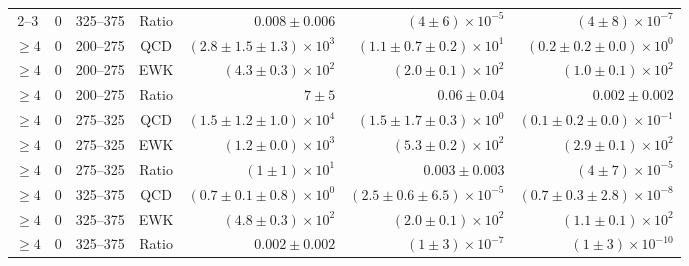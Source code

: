 \begin{table}[h!]
\begin{tabular}{ccccrrr}
2--3 & 0 & 325--375 & Ratio  & $0.008 \pm 0.006$ & $\left(4 \pm 6\right) \times 10^{-5}$ & $\left(4 \pm 8\right) \times 10^{-7}$\\ [1.0ex]
$\geq 4$ & 0 & 200--275 & QCD  & $\left(2.8 \pm 1.5 \pm 1.3 \right) \times 10^{3}$ & $\left(1.1 \pm 0.7 \pm 0.2 \right) \times 10^{1}$ & $\left(0.2 \pm 0.2 \pm 0.0 \right) \times 10^{0}$\\
$\geq 4$ & 0 & 200--275 & EWK  & $\left(4.3 \pm 0.3\right) \times 10^{2}$ & $\left(2.0 \pm 0.1\right) \times 10^{2}$ & $\left(1.0 \pm 0.1\right) \times 10^{2}$\\
$\geq 4$ & 0 & 200--275 & Ratio  & $7 \pm 5$ & $0.06 \pm 0.04$ & $0.002 \pm 0.002$\\ [1.0ex]
$\geq 4$ & 0 & 275--325 & QCD  & $\left(1.5 \pm 1.2 \pm 1.0 \right) \times 10^{4}$ & $\left(1.5 \pm 1.7 \pm 0.3 \right) \times 10^{0}$ & $\left(0.1 \pm 0.2 \pm 0.0 \right) \times 10^{-1}$\\
$\geq 4$ & 0 & 275--325 & EWK  & $\left(1.2 \pm 0.0\right) \times 10^{3}$ & $\left(5.3 \pm 0.2\right) \times 10^{2}$ & $\left(2.9 \pm 0.1\right) \times 10^{2}$\\
$\geq 4$ & 0 & 275--325 & Ratio  & $\left(1 \pm 1\right) \times 10^{1}$ & $0.003 \pm 0.003$ & $\left(4 \pm 7\right) \times 10^{-5}$\\ [1.0ex]
$\geq 4$ & 0 & 325--375 & QCD  & $\left(0.7 \pm 0.1 \pm 0.8 \right) \times 10^{0}$ & $\left(2.5 \pm 0.6 \pm 6.5 \right) \times 10^{-5}$ & $\left(0.7 \pm 0.3 \pm 2.8 \right) \times 10^{-8}$\\
$\geq 4$ & 0 & 325--375 & EWK  & $\left(4.8 \pm 0.3\right) \times 10^{2}$ & $\left(2.0 \pm 0.1\right) \times 10^{2}$ & $\left(1.1 \pm 0.1\right) \times 10^{2}$\\
$\geq 4$ & 0 & 325--375 & Ratio  & $0.002 \pm 0.002$ & $\left(1 \pm 3\right) \times 10^{-7}$ & $\left(1 \pm 3\right) \times 10^{-10}$\\ [1.0ex]
\hline
\hline
\end{tabular}
\end{table}

